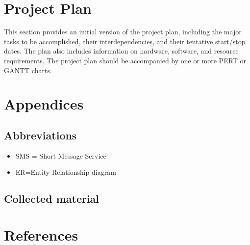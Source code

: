 \documentclass[]{article}
\begin{document}
\section{Project Plan}
This section provides an initial version of the project plan, including the major tasks to be accomplished, their interdependencies, and their tentative start/stop dates. The plan also includes information on hardware, software, and  resource requirements. 
The project plan should be accompanied by one or more PERT or GANTT charts. 

\section{Appendices}


\subsection{ Abbreviations}
\begin{itemize}

\item SMS = Short Message Service
\item ER=Entity Relationship diagram

\end{itemize}

\subsection{Collected material}

\section {References}




\end{document}
